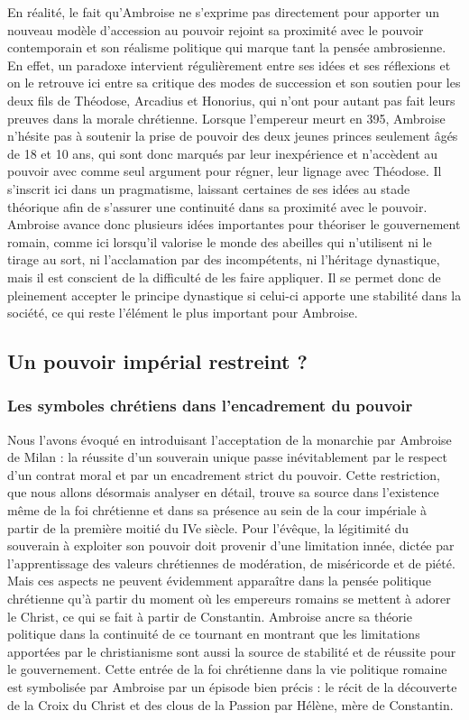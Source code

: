 En réalité, le fait qu'Ambroise ne s'exprime pas directement pour apporter un nouveau modèle d'accession au pouvoir rejoint sa proximité avec le pouvoir contemporain et son réalisme politique qui marque tant la pensée ambrosienne. En effet, un paradoxe intervient régulièrement entre ses idées et ses réflexions et on le retrouve ici entre sa critique des modes de succession et son soutien pour les deux fils de Théodose, Arcadius et Honorius, qui n'ont pour autant pas fait leurs preuves dans la morale chrétienne. Lorsque l'empereur meurt en 395, Ambroise n'hésite pas à soutenir la prise de pouvoir des deux jeunes princes seulement âgés de 18 et 10 ans, qui sont donc marqués par leur inexpérience et n'accèdent au pouvoir avec comme seul argument pour régner, leur lignage avec Théodose. Il s'inscrit ici dans un pragmatisme, laissant certaines de ses idées au stade théorique afin de s'assurer une continuité dans sa proximité avec le pouvoir. Ambroise avance donc plusieurs idées importantes pour théoriser le gouvernement romain, comme ici lorsqu'il valorise le monde des abeilles qui n'utilisent ni le tirage au sort, ni l'acclamation par des incompétents, ni l'héritage dynastique, mais il est conscient de la difficulté de les faire appliquer. Il se permet donc de pleinement accepter le principe dynastique si celui-ci apporte une stabilité dans la société, ce qui reste l'élément le plus important pour Ambroise.

\bigskip

\subsection{Un pouvoir impérial restreint ?}

\subsubsection{Les symboles chrétiens dans l'encadrement du pouvoir}

Nous l’avons évoqué en introduisant l’acceptation de la monarchie par Ambroise de Milan : la réussite d’un souverain unique passe inévitablement par le respect d'un contrat moral et par un encadrement strict du pouvoir. Cette restriction, que nous allons désormais analyser en détail, trouve sa source dans l'existence même de la foi chrétienne et dans sa présence au sein de la cour impériale à partir de la première moitié du IVe siècle. Pour l'évêque, la légitimité du souverain à exploiter son pouvoir doit provenir d'une limitation innée, dictée par l'apprentissage des valeurs chrétiennes de modération, de miséricorde et de piété. Mais ces aspects ne peuvent évidemment apparaître dans la pensée politique chrétienne qu'à partir du moment où les empereurs romains se mettent à adorer le Christ, ce qui se fait à partir de Constantin. Ambroise ancre sa théorie politique dans la continuité de ce tournant en montrant que les limitations apportées par le christianisme sont aussi la source de stabilité et de réussite pour le gouvernement. Cette entrée de la foi chrétienne dans la vie politique romaine est symbolisée par Ambroise par un épisode bien précis : le récit de la découverte de la Croix du Christ et des clous de la Passion par Hélène, mère de Constantin\autocite[ à 52]{ambroise_mort_theodose}.

